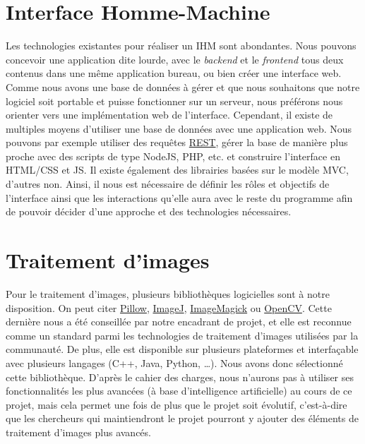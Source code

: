\section{Interface Homme-Machine}
	
Les technologies existantes pour réaliser un IHM sont abondantes. Nous pouvons concevoir une application dite lourde,
avec le \textit{backend} et le \textit{frontend} tous deux contenus dans une même application bureau, ou bien créer une interface web.
Comme nous avons une base de données à gérer et que nous souhaitons que notre logiciel soit portable et puisse fonctionner
sur un serveur, nous préférons nous orienter vers une implémentation web de l’interface. Cependant, il existe de multiples
moyens d’utiliser une base de données avec une application web. Nous pouvons par exemple utiliser des requêtes
\href{https://en.wikipedia.org/wiki/Representational_state_transfer}{REST}, gérer la base de manière plus proche avec des
scripts de type NodeJS, PHP, etc. et construire l’interface en HTML/CSS et JS. Il existe également des librairies basées sur
le modèle MVC, d’autres non. Ainsi, il nous est nécessaire de définir les rôles et objectifs de l’interface ainsi que les
interactions qu’elle aura avec le reste du programme afin de pouvoir décider d’une approche et des technologies nécessaires.

\section{Traitement d’images}

Pour le traitement d'images, plusieurs bibliothèques logicielles sont à notre disposition. On peut citer
\href{https://github.com/python-pillow/Pillow}{Pillow}, \href{https://github.com/imagej/imagej1}{ImageJ},
\href{https://www.imagemagick.org/script/index.php}{ImageMagick} ou \href{https://opencv.org/}{OpenCV}.
Cette dernière nous a été conseillée par notre encadrant de projet, et elle est reconnue comme un
standard parmi les technologies de traitement d'images utilisées par la communauté. De plus, elle est
disponible sur plusieurs plateformes et interfaçable avec plusieurs langages (C++, Java, Python, \ldots).
Nous avons donc sélectionné cette bibliothèque. D'après le cahier des charges, nous n'aurons pas à utiliser
ses fonctionnalités les plus avancées (à base d'intelligence artificielle) au cours de ce projet, mais cela
permet une fois de plus que le projet soit évolutif, c'est-à-dire que les chercheurs qui maintiendront le projet
pourront y ajouter des éléments de traitement d'images plus avancés.